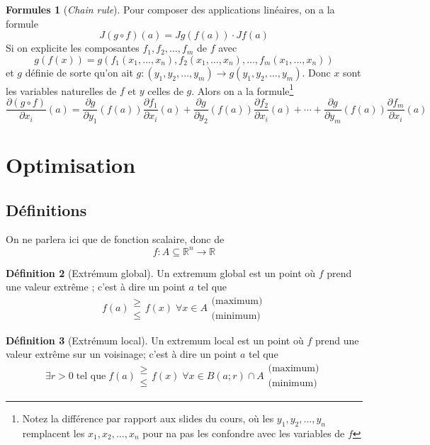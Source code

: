 \documentclass[11pt,a4paper]{article}
\theoremstyle{definition}
\newtheorem{mydef}{Définition}[section]
\newtheorem{myform}[mydef]{Formules}
\newcommand{\R}{\mathbb{R}}
\newcommand{\fl}{\rightarrow}
\newcommand{\pa}{\partial}
\begin{document}
\begin{myform}[\emph{Chain rule}]
Pour composer des applications linéaires, on a la formule
\[ J(g \circ f)(a) = Jg(f(a)) \cdot Jf(a) \]
Si on explicite les composantes $f_1, f_2, \dots , f_m$ de $f$ avec
\[ g(f(x)) = g( f_1(x_1, \dots, x_n), f_2(x_1, \dots, x_n), \dots, f_m(x_1, \dots, x_n)) \]
et $g$ définie de sorte qu'on ait $g : (y_1, y_2, \dots , y_m) \rightarrow g(y_1, y_2, \dots, y_m)$. Donc $x$ sont les variables naturelles de $f$ et $y$ celles de $g$.
Alors on a la formule\footnote{Notez la différence par rapport aux slides du cours, où les $y_1, y_2, \dots, y_n$ remplacent les $x_1, x_2, \dots, x_n$ pour na pas les confondre avec les variables de $f$}
\[ \frac{\pa (g \circ f)}{\pa x_i}(a) = \frac{ \pa g}{\pa y_1}(f(a)) \frac{\pa f_1}{\pa x_i}(a) + \frac{ \pa g}{\pa y_2}(f(a)) \frac{\pa f_2}{\pa x_i}(a) + \cdots + \frac{ \pa g}{\pa y_m}(f(a)) \frac{\pa f_m}{\pa x_i}(a) \]
\end{myform}


\section{Optimisation}

\subsection{Définitions}

On ne parlera ici que de fonction scalaire, donc de
\[ f : A \subseteq \R ^n \fl \R \]

\begin{mydef}[Extrémum global] Un extremum global est un point où $f$ prend une valeur extrême ; c'est à dire un point $a$ tel que
\[ f(a) \begin{array}{l} \geq \\ \leq \end{array} f(x) \; \forall x \in A \begin{array}{l} \text{(maximum)} \\ \text{(minimum)} \end{array} \]
\end{mydef}

\begin{mydef}[Extrémum local] Un extremum local est un point où $f$ prend une valeur extrême sur un voisinage; c'est à dire un point $a$ tel que
\[ \exists r >0 \; \text{tel que} \; f(a) \begin{array}{l} \geq \\ \leq \end{array} f(x) \; \forall x \in B(a;r) \cap A \begin{array}{l} \text{(maximum)} \\ \text{(minimum)} \end{array} \]
\end{mydef}
\end{document}
